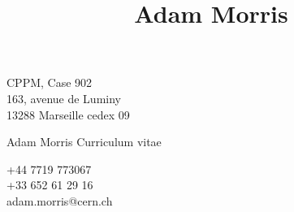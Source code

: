 \documentclass[contbibnum,titleabove]{simplecv}
\title{Adam Morris}
\begin{document}
	\fontfamily{\typeface}\selectfont
	\noindent\begin{minipage}{0.33\textwidth}
	CPPM, Case 902\\163, avenue de Luminy\\13288 Marseille cedex 09
	\end{minipage}
	\noindent\begin{minipage}{0.33\textwidth}
	\centering
	{\Huge Adam Morris}
	{\large Curriculum vitae}
	\end{minipage}
	\noindent\begin{minipage}{0.33\textwidth}
	\raggedleft
	+44 7719 773067\\+33 652 61 29 16\\{adam.morris@cern.ch}
	\end{minipage}
	
	
	
	
	
	
	
	
	
	
	
\end{document}
